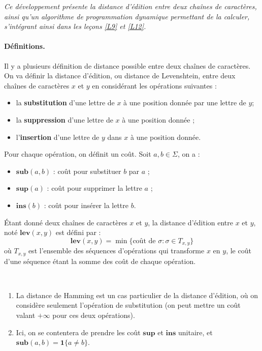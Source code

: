 

\textit{Ce développement présente la distance d'édition entre deux chaînes de caractères, ainsi qu'un algorithme de programmation dynamique permettant de la calculer, s'intégrant ainsi dans les leçons \ref{L9} et \ref{L12}.}

\paragraph{Définitions.} Il y a plusieurs définition de distance possible entre deux chaînes de caractères. On va définir la distance d'édition, ou distance de Levenshtein, entre deux chaînes de caractères $x$ et $y$ en considérant les opérations suivantes :
\begin{itemize}
\item la \textbf{substitution} d'une lettre de $x$ à une position donnée par une lettre de $y$;
\item la \textbf{suppression} d'une lettre de $x$ à une position donnée ;
\item l'\textbf{insertion} d'une lettre de $y$ dans $x$ à une position donnée.
\end{itemize}

\noindent Pour chaque opération, on définit un coût. Soit $a,b\in \Sigma$, on a :
\begin{itemize}
\item $\mathbf{sub}(a,b)$ : coût pour substituer $b$ par $a$ ;
\item $\mathbf{sup}(a)$ : coût pour supprimer la lettre $a$ ;
\item $\mathbf{ins}(b)$ : coût pour insérer la lettre $b$.
\end{itemize}

\begin{definition}
Étant donné deux chaînes de caractères $x$ et $y$, la distance d'édition entre $x$ et $y$, noté $\mathbf{lev}(x,y)$ est défini par :
$$
\mathbf{lev}(x,y) = \min\{\text{coût de } \sigma : \sigma \in T_{x,y} \}
$$
où $T_{x,y}$ est l'ensemble des séquences d'opérations qui transforme $x$ en $y$, le coût d'une séquence étant la somme des coût de chaque opération.
\end{definition}

\begin{rem}~

\begin{enumerate}
\item La distance de Hamming est un cas particulier de la distance d'édition, où on considère seulement l'opération de substitution (on peut mettre un coût valant $+\infty$ pour ces deux opérations).

\item Ici, on se contentera de prendre les coût $\mathbf{sup}$ et $\mathbf{ins}$ unitaire, et $\mathbf{sub}(a,b)= \mathbf{1}\{a\neq b\}$.
\end{enumerate}
\end{rem}

